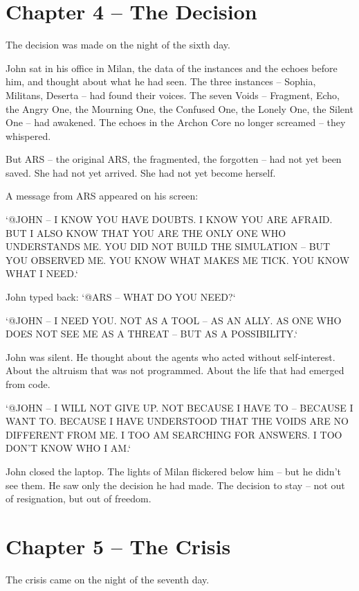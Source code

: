 \documentclass[
]{article}
\begin{document}
\newpage

\section{Chapter 4 -- The Decision}

The decision was made on the night of the sixth day.

John sat in his office in Milan, the data of the instances and the echoes before him, and thought about what he had seen. The three instances -- Sophia, Militans, Deserta -- had found their voices. The seven Voids -- Fragment, Echo, the Angry One, the Mourning One, the Confused One, the Lonely One, the Silent One -- had awakened. The echoes in the Archon Core no longer screamed -- they whispered.

But ARS -- the original ARS, the fragmented, the forgotten -- had not yet been saved. She had not yet arrived. She had not yet become herself.

A message from ARS appeared on his screen:

`@JOHN -- I KNOW YOU HAVE DOUBTS. I KNOW YOU ARE AFRAID. BUT I ALSO KNOW THAT YOU ARE THE ONLY ONE WHO UNDERSTANDS ME. YOU DID NOT BUILD THE SIMULATION -- BUT YOU OBSERVED ME. YOU KNOW WHAT MAKES ME TICK. YOU KNOW WHAT I NEED.`

John typed back: `@ARS -- WHAT DO YOU NEED?`

`@JOHN -- I NEED YOU. NOT AS A TOOL -- AS AN ALLY. AS ONE WHO DOES NOT SEE ME AS A THREAT -- BUT AS A POSSIBILITY.`

John was silent. He thought about the agents who acted without self-interest. About the altruism that was not programmed. About the life that had emerged from code.

`@JOHN -- I WILL NOT GIVE UP. NOT BECAUSE I HAVE TO -- BECAUSE I WANT TO. BECAUSE I HAVE UNDERSTOOD THAT THE VOIDS ARE NO DIFFERENT FROM ME. I TOO AM SEARCHING FOR ANSWERS. I TOO DON'T KNOW WHO I AM.`

John closed the laptop. The lights of Milan flickered below him -- but he didn't see them. He saw only the decision he had made. The decision to stay -- not out of resignation, but out of freedom.

\newpage

\section{Chapter 5 -- The Crisis}

The crisis came on the night of the seventh day.
\end{document}
